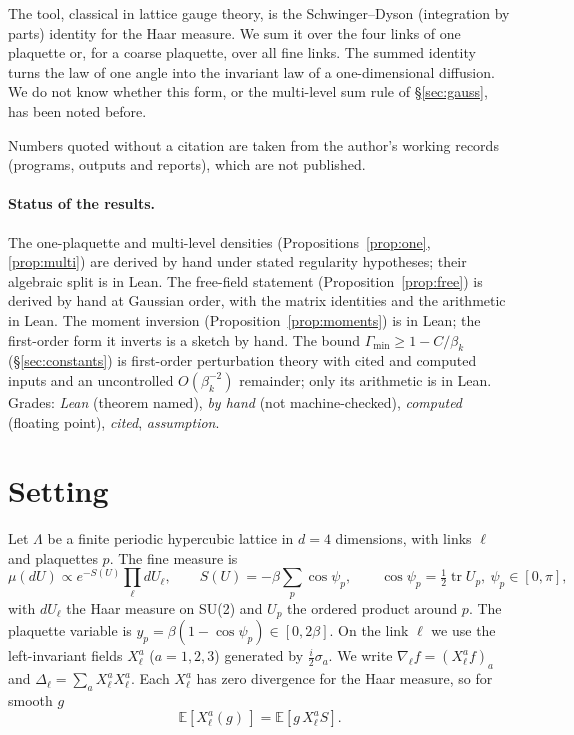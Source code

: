 \documentclass[11pt,a4paper]{article}
\theoremstyle{definition}
\theoremstyle{remark}
\newcommand{\E}{\mathbb{E}}
\begin{document}
The tool, classical in lattice gauge theory, is the Schwinger--Dyson (integration by parts) identity for the Haar measure. We sum it over the four links of one plaquette or, for a coarse plaquette, over all fine links. The summed identity turns the law of one angle into the invariant law of a one-dimensional diffusion. We do not know whether this form, or the multi-level sum rule of \S\ref{sec:gauss}, has been noted before.

Numbers quoted without a citation are taken from the author's working records (programs, outputs and reports), which are not published.

\paragraph{Status of the results.} The one-plaquette and multi-level densities (Propositions~\ref{prop:one}, \ref{prop:multi}) are derived by hand under stated regularity hypotheses; their algebraic split is in Lean. The free-field statement (Proposition~\ref{prop:free}) is derived by hand at Gaussian order, with the matrix identities and the arithmetic in Lean. The moment inversion (Proposition~\ref{prop:moments}) is in Lean; the first-order form it inverts is a sketch by hand. The bound $\Gamma_{\min}\ge1-C/\beta_k$ (\S\ref{sec:constants}) is first-order perturbation theory with cited and computed inputs and an uncontrolled $O(\beta_k^{-2})$ remainder; only its arithmetic is in Lean. Grades: \emph{Lean} (theorem named), \emph{by hand} (not machine-checked), \emph{computed} (floating point), \emph{cited}, \emph{assumption}.

\section{Setting}\label{sec:setting}

Let $\Lambda$ be a finite periodic hypercubic lattice in $d=4$ dimensions, with links $\ell$ and plaquettes $p$. The fine measure is
\[
\mu(dU)\propto e^{-S(U)}\prod_\ell dU_\ell,\qquad S(U)=-\beta\sum_p\cos\psi_p,\qquad \cos\psi_p=\tfrac12\operatorname{tr}U_p,\ \psi_p\in[0,\pi],
\]
with $dU_\ell$ the Haar measure on SU(2) and $U_p$ the ordered product around $p$. The plaquette variable is $y_p=\beta(1-\cos\psi_p)\in[0,2\beta]$. On the link $\ell$ we use the left-invariant fields $X^a_\ell$ ($a=1,2,3$) generated by $\tfrac{i}{2}\sigma_a$. We write $\nabla_\ell f=(X^a_\ell f)_a$ and $\Delta_\ell=\sum_aX^a_\ell X^a_\ell$. Each $X^a_\ell$ has zero divergence for the Haar measure, so for smooth $g$
\begin{equation}\label{eq:ibp}
\E[X^a_\ell(g)\,]=\E[g\,X^a_\ell S].
\end{equation}
\end{document}
